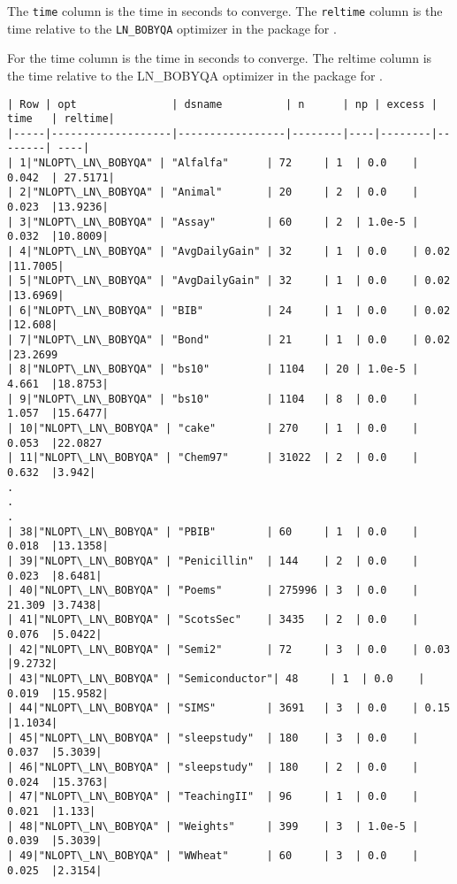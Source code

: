 \documentclass[article]{jss}
\begin{document}
The \texttt{time} column is the time in seconds to converge. The
\texttt{reltime} column is the time relative to the \texttt{LN\_BOBYQA}
optimizer in the  package for .

For  the time column is the time in seconds to converge. The reltime column is the time relative to the LN_BOBYQA optimizer in the  package for .


\begin{verbatim}
| Row | opt               | dsname          | n      | np | excess | time   | reltime|
|-----|-------------------|-----------------|--------|----|--------|--------| ----|
| 1|"NLOPT\_LN\_BOBYQA" | "Alfalfa"      | 72     | 1  | 0.0    | 0.042  | 27.5171|
| 2|"NLOPT\_LN\_BOBYQA" | "Animal"       | 20     | 2  | 0.0    | 0.023  |13.9236|
| 3|"NLOPT\_LN\_BOBYQA" | "Assay"        | 60     | 2  | 1.0e-5 | 0.032  |10.8009|
| 4|"NLOPT\_LN\_BOBYQA" | "AvgDailyGain" | 32     | 1  | 0.0    | 0.02   |11.7005|
| 5|"NLOPT\_LN\_BOBYQA" | "AvgDailyGain" | 32     | 1  | 0.0    | 0.02   |13.6969|
| 6|"NLOPT\_LN\_BOBYQA" | "BIB"          | 24     | 1  | 0.0    | 0.02   |12.608|
| 7|"NLOPT\_LN\_BOBYQA" | "Bond"         | 21     | 1  | 0.0    | 0.02   |23.2699
| 8|"NLOPT\_LN\_BOBYQA" | "bs10"         | 1104   | 20 | 1.0e-5 | 4.661  |18.8753|
| 9|"NLOPT\_LN\_BOBYQA" | "bs10"         | 1104   | 8  | 0.0    | 1.057  |15.6477|
| 10|"NLOPT\_LN\_BOBYQA" | "cake"        | 270    | 1  | 0.0    | 0.053  |22.0827
| 11|"NLOPT\_LN\_BOBYQA" | "Chem97"      | 31022  | 2  | 0.0    | 0.632  |3.942|
.
.
.
| 38|"NLOPT\_LN\_BOBYQA" | "PBIB"        | 60     | 1  | 0.0    | 0.018  |13.1358|
| 39|"NLOPT\_LN\_BOBYQA" | "Penicillin"  | 144    | 2  | 0.0    | 0.023  |8.6481|
| 40|"NLOPT\_LN\_BOBYQA" | "Poems"       | 275996 | 3  | 0.0    | 21.309 |3.7438|
| 41|"NLOPT\_LN\_BOBYQA" | "ScotsSec"    | 3435   | 2  | 0.0    | 0.076  |5.0422|
| 42|"NLOPT\_LN\_BOBYQA" | "Semi2"       | 72     | 3  | 0.0    | 0.03   |9.2732|
| 43|"NLOPT\_LN\_BOBYQA" | "Semiconductor"| 48     | 1  | 0.0    | 0.019  |15.9582|
| 44|"NLOPT\_LN\_BOBYQA" | "SIMS"        | 3691   | 3  | 0.0    | 0.15   |1.1034|
| 45|"NLOPT\_LN\_BOBYQA" | "sleepstudy"  | 180    | 3  | 0.0    | 0.037  |5.3039|
| 46|"NLOPT\_LN\_BOBYQA" | "sleepstudy"  | 180    | 2  | 0.0    | 0.024  |15.3763|
| 47|"NLOPT\_LN\_BOBYQA" | "TeachingII"  | 96     | 1  | 0.0    | 0.021  |1.133|
| 48|"NLOPT\_LN\_BOBYQA" | "Weights"     | 399    | 3  | 1.0e-5 | 0.039  |5.3039|
| 49|"NLOPT\_LN\_BOBYQA" | "WWheat"      | 60     | 3  | 0.0    | 0.025  |2.3154|
\end{verbatim}
\end{document}
